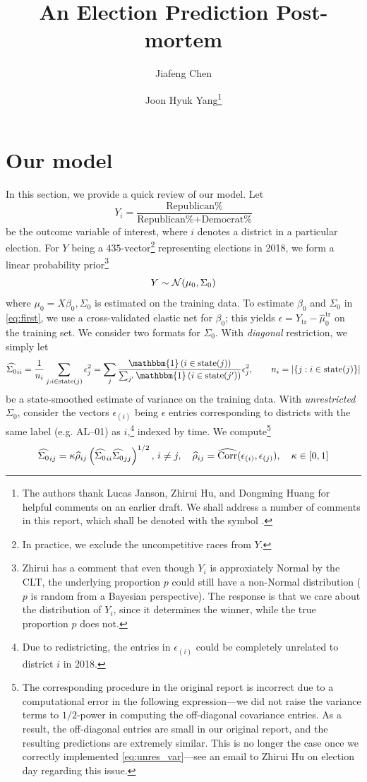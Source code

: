 \documentclass[12pt]{article}
\title{\vspace{-1.5cm}\sffamily\bfseries{An Election Prediction Post-mortem}}
\author{\vspace{-.5cm}Jiafeng Chen \and Joon Hyuk Yang\thanks{The authors thank Lucas Janson, Zhirui Hu, and Dongming Huang for helpful comments on an earlier draft. We shall address a number of comments in this report, which shall be denoted with the symbol \cm.}}
\newcommand{\cm}{{\color{Red}{\textsf{[C]}}}}
\newcommand{\one}{\mathbbm{1}}
\begin{document}
\maketitle
\section{Our model}
\label{sec:intro}

In this section, we provide a quick review of our model. Let \begin{equation}
  Y_i = \frac{\text{Republican\%}}{\text{Republican\%}+\text{Democrat\%}}
  \label{eq:def_y}
\end{equation}
be the outcome variable of interest, where $i$ denotes a district in a particular election. For $Y$ being a $435$-vector\footnote{In practice, we exclude the uncompetitive races from $Y$.} representing elections in 2018, we form a linear probability prior\footnote{\cm{} Zhirui has a comment that even though $Y_i$ is approxiately Normal by the CLT, the underlying proportion $p$ could still have a non-Normal distribution ($p$ is random from a Bayesian perspective). The response is that we care about the distribution of $Y_i$, since it determines the winner, while the true proportion $p$ does not.} \begin{equation}
  Y \sim \mathcal{N}(\mu_0, \Sigma_0)\label{eq:first}
\end{equation}
where $\mu_0 = X\beta_0, \Sigma_0$ is estimated
on the training data. To estimate $\beta_0$ and $\Sigma_0$ in \eqref{eq:first}, we use a cross-validated elastic net for $\beta_0$; this yields $\epsilon = Y_{\text{tr}} - \hat \mu_0^{\text{tr}}$ on the training set. We consider two formats for $\Sigma_0$. With \emph{diagonal} restriction, we simply let 
\begin{equation}
  \hat {\Sigma_0}_{ii} = \frac{1}{n_i} \sum_{j : i\in\text{state}(j)} \epsilon_j^2 = \sum_j \frac{\one\pr{i\in\text{state}(j)}}{\sum_{j'} \one\pr{i\in\text{state}(j')}} \epsilon_j^2, \qquad n_i = |\{j : i\in\text{state}(j)\}|
\label{eq:diag_var}
\end{equation}
be a state-smoothed estimate of variance on the training data. With \emph{unrestricted} $\Sigma_0$, consider the vectors $\epsilon_{(i)}$ being $\epsilon$ entries corresponding to districts with the same label (e.g. AL--01) as $i$,\footnote{Due to redistricting, the entries in $\epsilon_{(i)}$ could be completely unrelated to district $i$ in 2018.} indexed by time. We compute\footnote{\cm{} The corresponding procedure in the original report is incorrect due to a computational error in the following expression---we did not raise the variance terms to $1/2$-power in computing the off-diagonal covariance entries. As a result, the off-diagonal entries are small in our original report, and the resulting predictions are extremely similar. This is no longer the case once we correctly implemented \eqref{eq:unres_var}---see an email to Zhirui Hu on election day regarding this issue.} \begin{equation}
  \widehat{\Sigma_0}_{ij} = \kappa \widehat \rho_{ij} \left({\widehat {\Sigma_0}_{ii} \widehat {\Sigma_0}_{jj}}\right)^{1/2},\, i\neq j,\quad \widehat \rho_{ij} = \widehat{\operatorname{Corr}}(\epsilon_{(i)}, \epsilon_{(j)}), \quad \kappa\in [0,1]
\label{eq:unres_var}
\end{equation}
\end{document}
